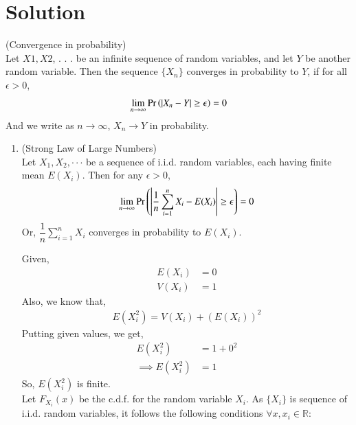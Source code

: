 \documentclass[journal,12pt,twocolumn]{IEEEtran}
\begin{document}
\section{Solution}
\begin{definition}
    (Convergence in probability)\\
    Let $X1, X2$, . . . be an infinite sequence of random variables, and let $Y$ be another random variable. Then the sequence $\{X_n\}$ converges in probability to $Y$, if for all $\epsilon >0$, 
    \begin{align}
        \lim_{n \to \infty}\Pr\left(|X_n-Y|\geq \epsilon\right)=0
    \end{align}
And we write as $n \to \infty$, $X_n \to Y$ in probability.
\end{definition}
\begin{enumerate}
    \item 
        \begin{theorem}
            (Strong Law of Large Numbers)\\
            Let $X_1, X_2, \cdot \cdot \cdot$ be a sequence of i.i.d. random variables, each having finite mean $E(X_i)$. Then for any $\epsilon >0$,
            \begin{align}
                \lim_{n \to \infty}\Pr\left(\left|\dfrac{1}{n}\sum_{i=1}^nX_i - E(X_i)\right|\geq \epsilon\right)=0
            \end{align}
            Or, $\dfrac{1}{n}\sum_{i=1}^nX_i$ converges in probability to $E(X_i)$.
        \end{theorem}
        Given,
        \begin{align} 
            E(X_i)&=0 
            \label{a}\\
            V(X_i)&=1
            \label{b}
        \end{align}
        Also, we know that,
        \begin{align}
            E(X_i^2)=V(X_i)+(E(X_i))^2
        \end{align}
        Putting given values, we get,
        \begin{align} \label{c}
            E(X_i^2)&=1+0^2\\
            \implies E(X_i^2)&=1
        \end{align}
        So, $E(X_i^2)$ is finite.\\
        Let $F_{X_i}(x)$ be the c.d.f. for the random variable $X_i$.
        As $\{X_i\}$ is sequence of i.i.d. random variables, it follows the following conditions $\forall x,x_i \in \mathbb{R}$:
        \begin{enumerate}

\end{enumerate}
\end{enumerate}
\end{document}
